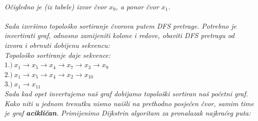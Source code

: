\documentclass[12pt]{article}
\begin{document}
\begin{enumerate}
\begin{center}
     \\
      \vspace{0.5cm}
    \textit{Očigledno je (iz tabele) izvor čvor $x_9$, a ponor čvor $x_1$.}\\
    \vspace{0.3cm}
    \\

    \textit{Sada izvršimo topološko sortiranje čvorova putem DFS pretrage. Potrebno je invertirati graf, odnosno zamijeniti kolone i redove, obaviti DFS pretragu od izvora i obrnuti dobijenu sekvencu:\\
    Topološko sortiranje daje sekvence: \\$ 1.) \ x_1 \rightarrow x_5 \rightarrow x_4 \rightarrow x_7 \rightarrow x_3 \rightarrow x_9$ \\
    $2.) \ x_1 \rightarrow x_5 \rightarrow x_4 \rightarrow x_2 \rightarrow x_{10}$ \\
    $3.) \   x_1 \rightarrow x_{11}$\\
    Sada kad opet invertujemo naš graf dobijamo topološki sortiran naš početni graf. Kako
    niti u jednom trenutku nismo
naišli na prethodno posjećen čvor, samim time je graf \textbf{acikličan}.
    }
    \vspace{0.5cm}
    \textit{Primijenimo Dijkstrin algoritam za pronalazak najkraćeg puta:\\}
    

\end{center}
\end{enumerate}
\end{document}

